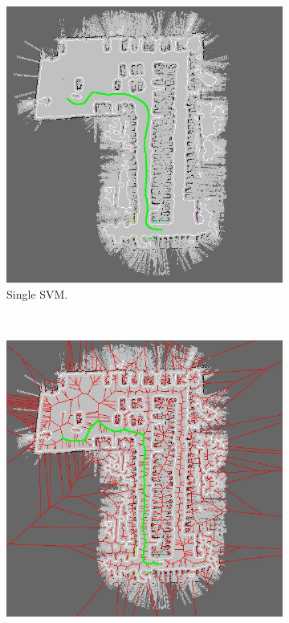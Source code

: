 \begin{figure}[h!]
\begin{subfigure}[b]{0.45\textwidth}
	  \includegraphics[width=\textwidth,height=\textwidth, trim=0 0 0 0,clip]{figure15}
	  \caption{Single \ac{SVM}.}
	  \label{fig:cp06_singl_svm_final}
  \end{subfigure}
  ~
  \begin{subfigure}[b]{0.45\textwidth}
	  \centering
	  \includegraphics[width=\textwidth,height=\textwidth, trim=0 0 0 0,clip]{figure16}

\end{subfigure}
\end{figure}

